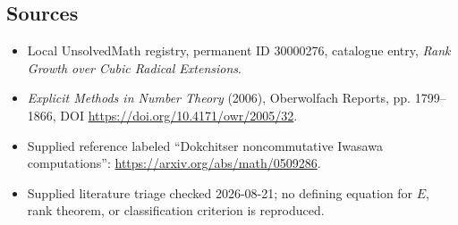 \documentclass[11pt]{article}
\begin{document}
\subsection{Sources}
\begin{itemize}
\item Local UnsolvedMath registry, permanent ID 30000276, catalogue entry, \emph{Rank Growth over Cubic Radical Extensions}.
\item \emph{Explicit Methods in Number Theory} (2006), Oberwolfach Reports, pp. 1799--1866, DOI \url{https://doi.org/10.4171/owr/2005/32}.
\item Supplied reference labeled ``Dokchitser noncommutative Iwasawa computations'': \url{https://arxiv.org/abs/math/0509286}.
\item Supplied literature triage checked 2026-08-21; no defining equation for \(E\), rank theorem, or classification criterion is reproduced.
\end{itemize}
\end{document}
